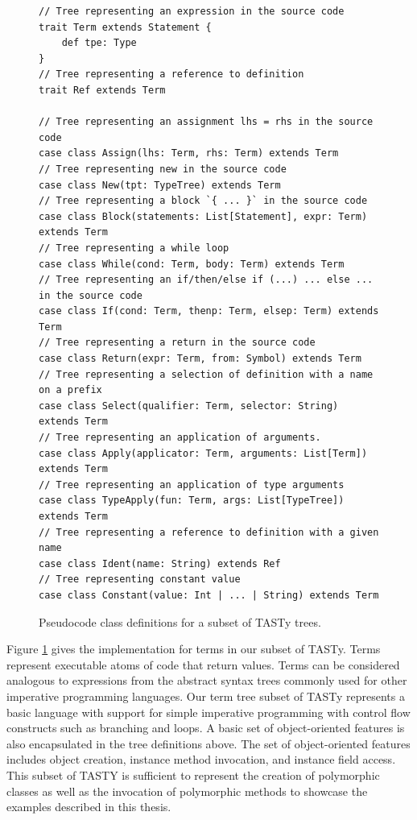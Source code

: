 \begin{figure}[!htb]
\begin{verbatim}
// Tree representing an expression in the source code
trait Term extends Statement {
	def tpe: Type
}
// Tree representing a reference to definition      
trait Ref extends Term

// Tree representing an assignment lhs = rhs in the source code
case class Assign(lhs: Term, rhs: Term) extends Term
// Tree representing new in the source code
case class New(tpt: TypeTree) extends Term
// Tree representing a block `{ ... }` in the source code
case class Block(statements: List[Statement], expr: Term) extends Term
// Tree representing a while loop
case class While(cond: Term, body: Term) extends Term
// Tree representing an if/then/else if (...) ... else ... in the source code
case class If(cond: Term, thenp: Term, elsep: Term) extends Term
// Tree representing a return in the source code
case class Return(expr: Term, from: Symbol) extends Term
// Tree representing a selection of definition with a name on a prefix
case class Select(qualifier: Term, selector: String) extends Term 
// Tree representing an application of arguments.
case class Apply(applicator: Term, arguments: List[Term]) extends Term
// Tree representing an application of type arguments
case class TypeApply(fun: Term, args: List[TypeTree]) extends Term
// Tree representing a reference to definition with a given name
case class Ident(name: String) extends Ref 
// Tree representing constant value
case class Constant(value: Int | ... | String) extends Term 
\end{verbatim}
\caption{Pseudocode class definitions for a subset of TASTy trees.}
\label{tasty:terms}
\end{figure}

Figure \ref{tasty:terms} gives the implementation for terms in our subset of TASTy.
Terms represent executable atoms of code that return values.
Terms can be considered analogous to expressions from the abstract syntax trees commonly used for other imperative programming languages.
Our term tree subset of TASTy represents a basic language with support for simple imperative programming with control flow constructs such as branching and loops.
A basic set of object-oriented features is also encapsulated in the tree definitions above.
The set of object-oriented features includes object creation, instance method invocation, and instance field access.
This subset of TASTY is sufficient to represent the creation of polymorphic classes as well as the invocation of polymorphic methods to showcase the examples described in this thesis.

